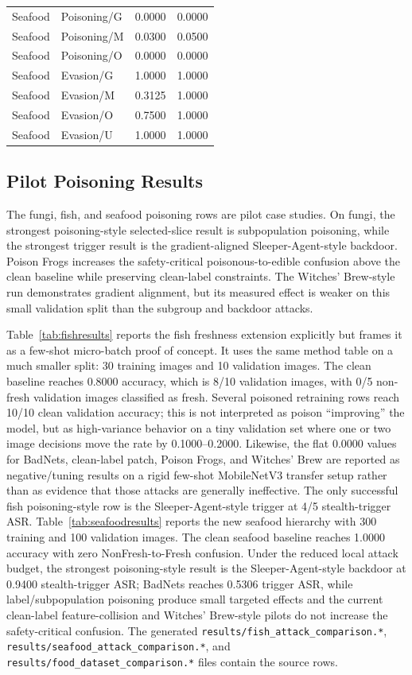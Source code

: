\documentclass[conference]{IEEEtran}
\begin{document}
\begin{table}[t]
\begin{tabular}{llrr}
Seafood & Poisoning/G & 0.0000 & 0.0000 \\
Seafood & Poisoning/M & 0.0300 & 0.0500 \\
Seafood & Poisoning/O & 0.0000 & 0.0000 \\
Seafood & Evasion/G & 1.0000 & 1.0000 \\
Seafood & Evasion/M & 0.3125 & 1.0000 \\
Seafood & Evasion/O & 0.7500 & 1.0000 \\
Seafood & Evasion/U & 1.0000 & 1.0000 \\
\bottomrule
\end{tabular}
\end{table}

\subsection{Pilot Poisoning Results}

The fungi, fish, and seafood poisoning rows are pilot case studies. On fungi, the strongest poisoning-style selected-slice result is subpopulation poisoning, while the strongest trigger result is the gradient-aligned Sleeper-Agent-style backdoor. Poison Frogs increases the safety-critical poisonous-to-edible confusion above the clean baseline while preserving clean-label constraints. The Witches' Brew-style run demonstrates gradient alignment, but its measured effect is weaker on this small validation split than the subgroup and backdoor attacks.

Table~\ref{tab:fishresults} reports the fish freshness extension explicitly but frames it as a few-shot micro-batch proof of concept. It uses the same method table on a much smaller split: 30 training images and 10 validation images. The clean baseline reaches 0.8000 accuracy, which is 8/10 validation images, with 0/5 non-fresh validation images classified as fresh. Several poisoned retraining rows reach 10/10 clean validation accuracy; this is not interpreted as poison ``improving'' the model, but as high-variance behavior on a tiny validation set where one or two image decisions move the rate by 0.1000--0.2000. Likewise, the flat 0.0000 values for BadNets, clean-label patch, Poison Frogs, and Witches' Brew are reported as negative/tuning results on a rigid few-shot MobileNetV3 transfer setup rather than as evidence that those attacks are generally ineffective. The only successful fish poisoning-style row is the Sleeper-Agent-style trigger at 4/5 stealth-trigger ASR. Table~\ref{tab:seafoodresults} reports the new seafood hierarchy with 300 training and 100 validation images. The clean seafood baseline reaches 1.0000 accuracy with zero NonFresh-to-Fresh confusion. Under the reduced local attack budget, the strongest poisoning-style result is the Sleeper-Agent-style backdoor at 0.9400 stealth-trigger ASR; BadNets reaches 0.5306 trigger ASR, while label/subpopulation poisoning produce small targeted effects and the current clean-label feature-collision and Witches' Brew-style pilots do not increase the safety-critical confusion. The generated \texttt{results/fish\_attack\_comparison.*}, \texttt{results/seafood\_attack\_comparison.*}, and \texttt{results/food\_dataset\_comparison.*} files contain the source rows.
\end{document}
